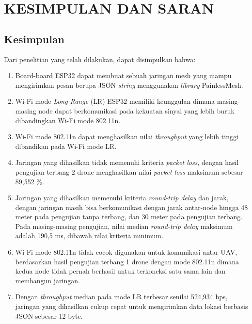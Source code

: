 \chapter{KESIMPULAN DAN SARAN}
\section{Kesimpulan}
Dari penelitian yang telah dilakukan, dapat disimpulkan bahwa:
\begin{enumerate}
	\item Board-board ESP32 dapat membuat sebuah jaringan mesh yang mampu mengirimkan pesan berupa JSON \textit{string} menggunakan \textit{library} PainlessMesh.
	
	\item Wi-Fi mode \textit{Long Range} (LR) ESP32 memiliki keunggulan dimana masing-masing node dapat berkomunikasi pada kekuatan sinyal yang lebih buruk dibandingkan Wi-Fi mode 802.11n.
	
	\item Wi-Fi mode 802.11n dapat menghasilkan nilai \textit{throughput} yang lebih tinggi dibandikan pada Wi-Fi mode LR.
	
	\item Jaringan yang dihasilkan tidak memenuhi kriteria \textit{packet loss}, dengan hasil pengujian terbang 2 drone menghasilkan nilai \textit{packet loss} maksimum sebesar 89,552 \%.
	
	\item Jaringan yang dihasilkan memenuhi kriteria \textit{round-trip delay} dan jarak, dengan jaringan masih bisa berkomunikasi dengan jarak antar-node hingga 48 meter pada pengujian tanpa terbang, dan 30 meter pada pengujian terbang. Pada masing-masing pengujian, nilai median \textit{round-trip delay} maksimum adalah 190,5 ms, dibawah nilai kriteria minimum.
	
	\item Wi-Fi mode 802.11n tidak cocok digunakan untuk komunikasi antar-UAV, berdasarkan hasil pengujian terbang 1 drone dengan mode 802.11n dimana kedua node tidak pernah berhasil untuk terkoneksi satu sama lain dan membangun jaringan.
	
	\item Dengan \textit{throughput} median pada mode LR terbesar senilai 524,934 bps, jaringan yang dihasilkan cukup cepat untuk mengirimkan data lokasi berbasis JSON sebesar 12 byte.
\end{enumerate}

